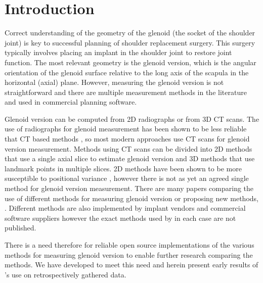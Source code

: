 \section{Introduction}
\label{sec:introduction}
Correct understanding of the geometry of the glenoid (the socket of the shoulder joint) is
key to successful planning of shoulder replacement surgery. This surgery typically involves
placing an implant in the shoulder joint to restore joint function. The most relevant
geometry is the glenoid version, which is the angular orientation of the glenoid surface
relative to the long axis of the scapula in the horizontal (axial) plane. 
However, measuring the glenoid version is not
straightforward and there are multiple measurement methods in the literature and used in
commercial planning software. 

Glenoid version can be computed from {2D} radiographs or from {3D} {CT} scans.
The use of radiographs for glenoid measurement has been shown to be less 
reliable that {CT} based methods \cite{nyffeler2003measurement}, so 
most modern approaches use {CT} scans for glenoid version measurement. 
Methods using {CT} scans can be divided into {2D} methods that 
use a single axial slice to estimate glenoid version and {3D} 
methods that use landmark points in multiple slices. {2D} methods 
have been shown to be more susceptible to positional variance \cite{bryce2010two}, 
however there is not as yet an agreed single method for glenoid version measurement.
There are many papers comparing the use of
different methods for measuring glenoid version or proposing new 
methods, \cite{PMID:33330245, PMID:32010231, PMID:29298261, PMID:33554174}. 
Different methods are also implemented by implant vendors and commercial 
software suppliers \cite{blueprint, exactech, djosurgical} however the exact methods
used by in each case are not published. 

There is a need therefore for reliable open source implementations of the various 
methods for measuring glenoid version to enable further research comparing the methods. 
We have developed \sksglenoid to meet this need and herein present early results of \sksglenoidns's 
use on retrospectively gathered data.
